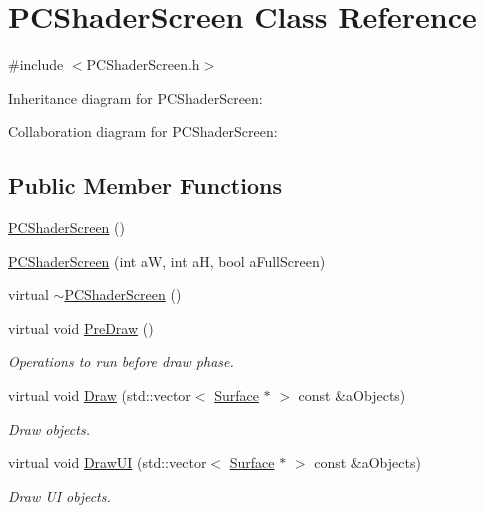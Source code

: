 \hypertarget{classPCShaderScreen}{}\section{P\+C\+Shader\+Screen Class Reference}
\label{classPCShaderScreen}


{\ttfamily \#include $<$P\+C\+Shader\+Screen.\+h$>$}



Inheritance diagram for P\+C\+Shader\+Screen\+:


Collaboration diagram for P\+C\+Shader\+Screen\+:
\subsection*{Public Member Functions}
\begin{DoxyCompactItemize}
\item 
\hyperlink{classPCShaderScreen_a8fd040b6530f215e6bcecdfc0a19fdad}{P\+C\+Shader\+Screen} ()
\item 
\hyperlink{classPCShaderScreen_a4d676589a85a619e93937a48adaec28c}{P\+C\+Shader\+Screen} (int aW, int aH, bool a\+Full\+Screen)
\item 
virtual \hyperlink{classPCShaderScreen_a9e16199f48e225a0ab91e41b928ec65f}{$\sim$\+P\+C\+Shader\+Screen} ()
\item 
virtual void \hyperlink{classPCShaderScreen_a4b103d2af283e955678b41b759d51822}{Pre\+Draw} ()
\begin{DoxyCompactList}\small\item\em Operations to run before draw phase. \end{DoxyCompactList}\item 
virtual void \hyperlink{classPCShaderScreen_a93f1b26c49c24dd055a6ac2af866c367}{Draw} (std\+::vector$<$ \hyperlink{classSurface}{Surface} $\ast$ $>$ const \&a\+Objects)
\begin{DoxyCompactList}\small\item\em Draw objects. \end{DoxyCompactList}\item 
virtual void \hyperlink{classPCShaderScreen_a4ce134f7cd81f8923a131705ae3536d7}{Draw\+UI} (std\+::vector$<$ \hyperlink{classSurface}{Surface} $\ast$ $>$ const \&a\+Objects)
\begin{DoxyCompactList}\small\item\em Draw UI objects. \end{DoxyCompactList}\item 

\end{DoxyCompactItemize}
